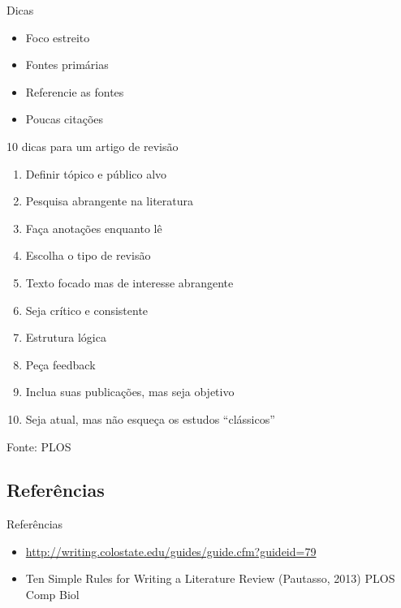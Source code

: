 \documentclass{beamer}
\begin{document}
\begin{frame}{Dicas}
  \begin{itemize}
  \item Foco estreito
  \item Fontes primárias
  \item Referencie as fontes
  \item Poucas citações
  \end{itemize}
\end{frame}


\begin{frame}{10 dicas para um artigo de revisão}
  \begin{enumerate}
  \item Definir tópico e público alvo
  \item Pesquisa abrangente na literatura
  \item Faça anotações enquanto lê
  \item Escolha o tipo de revisão
  \item Texto focado mas de interesse abrangente
  \item Seja crítico e consistente
  \item Estrutura lógica
  \item Peça feedback
  \item Inclua suas publicações, mas seja objetivo
  \item Seja atual, mas não esqueça os estudos ``clássicos''
  \end{enumerate}
Fonte: PLOS
\end{frame}

\subsection{Referências}

\begin{frame}{Referências}
  \begin{itemize}
  \item<1->
    \url{http://writing.colostate.edu/guides/guide.cfm?guideid=79}
  \item<1-> Ten Simple Rules for Writing a Literature Review
    (Pautasso, 2013) PLOS Comp Biol
  \end{itemize}
\end{frame}
\end{document}
